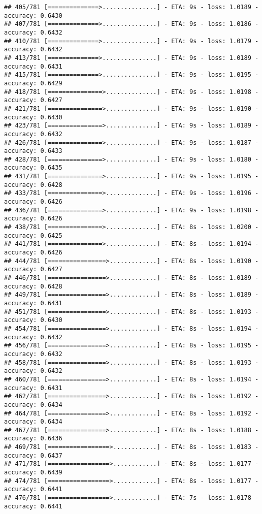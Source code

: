 \documentclass[
]{article}
\begin{document}
\begin{verbatim}
## 405/781 [==============>...............] - ETA: 9s - loss: 1.0189 - accuracy: 0.6430
## 407/781 [==============>...............] - ETA: 9s - loss: 1.0186 - accuracy: 0.6432
## 410/781 [==============>...............] - ETA: 9s - loss: 1.0179 - accuracy: 0.6432
## 413/781 [==============>...............] - ETA: 9s - loss: 1.0189 - accuracy: 0.6431
## 415/781 [==============>...............] - ETA: 9s - loss: 1.0195 - accuracy: 0.6429
## 418/781 [===============>..............] - ETA: 9s - loss: 1.0198 - accuracy: 0.6427
## 421/781 [===============>..............] - ETA: 9s - loss: 1.0190 - accuracy: 0.6430
## 423/781 [===============>..............] - ETA: 9s - loss: 1.0189 - accuracy: 0.6432
## 426/781 [===============>..............] - ETA: 9s - loss: 1.0187 - accuracy: 0.6433
## 428/781 [===============>..............] - ETA: 9s - loss: 1.0180 - accuracy: 0.6435
## 431/781 [===============>..............] - ETA: 9s - loss: 1.0195 - accuracy: 0.6428
## 433/781 [===============>..............] - ETA: 9s - loss: 1.0196 - accuracy: 0.6426
## 436/781 [===============>..............] - ETA: 9s - loss: 1.0198 - accuracy: 0.6426
## 438/781 [===============>..............] - ETA: 8s - loss: 1.0200 - accuracy: 0.6425
## 441/781 [===============>..............] - ETA: 8s - loss: 1.0194 - accuracy: 0.6426
## 444/781 [================>.............] - ETA: 8s - loss: 1.0190 - accuracy: 0.6427
## 446/781 [================>.............] - ETA: 8s - loss: 1.0189 - accuracy: 0.6428
## 449/781 [================>.............] - ETA: 8s - loss: 1.0189 - accuracy: 0.6431
## 451/781 [================>.............] - ETA: 8s - loss: 1.0193 - accuracy: 0.6430
## 454/781 [================>.............] - ETA: 8s - loss: 1.0194 - accuracy: 0.6432
## 456/781 [================>.............] - ETA: 8s - loss: 1.0195 - accuracy: 0.6432
## 458/781 [================>.............] - ETA: 8s - loss: 1.0193 - accuracy: 0.6432
## 460/781 [================>.............] - ETA: 8s - loss: 1.0194 - accuracy: 0.6431
## 462/781 [================>.............] - ETA: 8s - loss: 1.0192 - accuracy: 0.6434
## 464/781 [================>.............] - ETA: 8s - loss: 1.0192 - accuracy: 0.6434
## 467/781 [================>.............] - ETA: 8s - loss: 1.0188 - accuracy: 0.6436
## 469/781 [=================>............] - ETA: 8s - loss: 1.0183 - accuracy: 0.6437
## 471/781 [=================>............] - ETA: 8s - loss: 1.0177 - accuracy: 0.6439
## 474/781 [=================>............] - ETA: 8s - loss: 1.0177 - accuracy: 0.6441
## 476/781 [=================>............] - ETA: 7s - loss: 1.0178 - accuracy: 0.6441

\end{verbatim}
\end{document}
